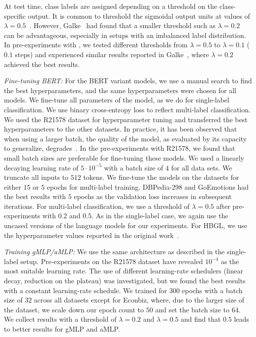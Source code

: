 At test time, class labels are assigned depending on a threshold on the class-specific output.
It is common to threshold the sigmoidal output units at values of $\lambda = 0.5$~\cite{zhang,Tsoumakas}. 
However, Galke~\etal\cite{DBLP:conf/kcap/GalkeMSBS17} had found that a smaller threshold such as $\lambda=0.2$ can be advantageous, especially in setups with an imbalanced label distribution.
In pre-experiments with \mlp, we tested different thresholds from $\lambda=0.5$ to $\lambda=0.1$ ($0.1$ steps) and experienced similar results reported in Galke~\etal\cite{DBLP:conf/kcap/GalkeMSBS17}, where $\lambda=0.2$ achieved the best results.

\textit{Fine-tuning BERT:}
For the BERT variant models, we use a manual search to find the best hyperparameters, and the same hyperparameters were chosen for all models. 
We fine-tune all parameters of the model, as we do for single-label classification.
We use binary cross-entropy loss to reflect multi-label classification. 
We used the R21578 dataset for hyperparameter tuning and transferred the best hyperparameters to the other datasets.
In practice, it has been observed that when using a larger batch, the quality of the model, as evaluated by its capacity to generalize, degrades~\cite{NEURIPS2020_f3f27a32}.
In the pre-experiments with R21578, we found that small batch sizes are preferable for fine-tuning these models.
We used a linearly decaying learning rate of $5 \cdot 10^{-5}$ 
with a batch size of $4$ for all data sets.
We truncate all inputs to $512$ tokens.
We fine-tune the models on the datasets for either $15$ or $5$ epochs for multi-label training.
DBPedia-298 and GoEmotions had the best results with $5$ epochs as the validation loss increases in subsequent iterations.
For multi-label classification, we use a threshold of $\lambda=0.5$ after pre-experiments with $0.2$ and $0.5$. 
As in the single-label case, we again use the uncased versions of the language models for our experiments.
For HBGL, we use the hyperparameter values reported in the original work~\cite{hbgl}.

\textit{Training gMLP/aMLP:}
We use the same architecture as described in the single-label setup. Pre-experiments on the R21578 dataset have revealed $10^{-4}$ as the most suitable learning rate. The use of different learning-rate schedulers (linear decay, reduction on the plateau) was investigated, but we found the best results with a constant learning-rate schedule.
We trained for $300$ epochs with a batch size of $32$ across all datasets except for Econbiz, where, due to the larger size of the dataset, we scale down our epoch count to $50$ and set the batch size to $64$.  We collect results with a threshold of $\lambda=0.2$ and $\lambda=0.5$ and find that $0.5$ leads to better results for gMLP and aMLP.


